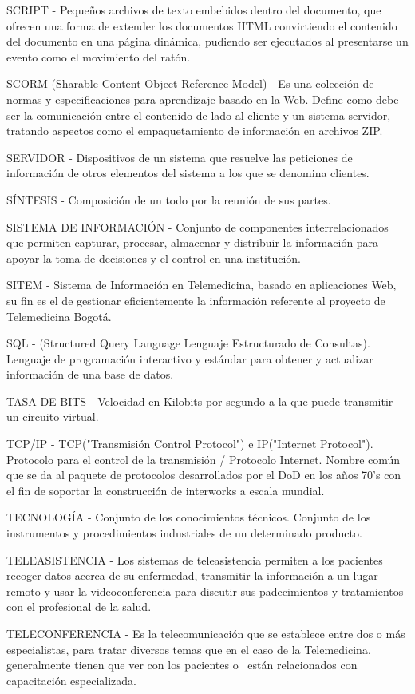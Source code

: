 SCRIPT -  Pequeños archivos de texto embebidos dentro del documento, que ofrecen una forma de extender los documentos HTML convirtiendo el contenido del documento en una página dinámica, pudiendo ser ejecutados al presentarse un evento como el movimiento del ratón.

SCORM (Sharable Content Object Reference Model) - Es una colección de normas y especificaciones para aprendizaje basado en la Web.  Define como debe ser la comunicación entre el contenido de lado al cliente y un sistema servidor, tratando aspectos como el empaquetamiento de información en archivos ZIP.

SERVIDOR - Dispositivos de un sistema que resuelve las peticiones de información de otros elementos del sistema a los que se denomina clientes.

SÍNTESIS - Composición de un todo por la reunión de sus partes.

SISTEMA DE INFORMACIÓN - Conjunto de componentes interrelacionados que permiten capturar, procesar, almacenar y distribuir la información para apoyar la toma de decisiones y el control en una institución.

SITEM - Sistema de Información en Telemedicina, basado en aplicaciones Web, su fin es el de gestionar eficientemente la información referente al proyecto de Telemedicina Bogotá.

SQL - (Structured Query Language Lenguaje Estructurado de Consultas). Lenguaje de programación interactivo y estándar para obtener y actualizar información de una base de datos.

TASA DE BITS  - Velocidad en Kilobits por segundo a la que puede transmitir un circuito virtual.

TCP/IP - TCP("Transmisión Control Protocol") e IP("Internet Protocol"). Protocolo para el control de la transmisión / Protocolo Internet. Nombre común que se da al paquete de protocolos desarrollados  por el DoD en los años 70’s con el fin de soportar la construcción de interworks a escala mundial.

TECNOLOGÍA - Conjunto de los conocimientos técnicos. Conjunto de los instrumentos y procedimientos industriales de un determinado producto.

TELEASISTENCIA - Los sistemas de teleasistencia permiten a los pacientes recoger datos acerca de su enfermedad, transmitir la información a un lugar remoto y usar la videoconferencia para discutir sus padecimientos y tratamientos con el profesional de la salud.

TELECONFERENCIA - Es la telecomunicación que se establece entre dos o más especialistas, para tratar diversos temas que en el caso de la Telemedicina, generalmente tienen que ver con los pacientes o  están relacionados con capacitación especializada.


